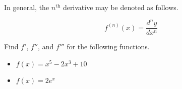 \documentclass[12pt]{article}
\begin{document}
\vspace{3mm}

In general, the $n^\text{th}$ derivative may be denoted as follows.

$$f^{(n)}(x)=\frac{d^ny}{dx^n}$$

\newpage

\Example Find $f'$, $f''$, and $f'''$ for the following functions.

\begin{itemize}
	\item[\tc{1}] $f(x)=x^5-2x^3+10$
	
	\vspace{30mm}
	
	\item[\tc{2}] $f(x)=2e^x$
	
	\vspace{30mm}
\end{itemize}
\end{document}
